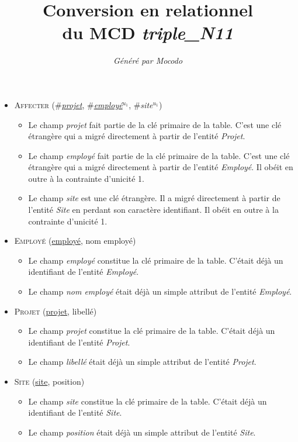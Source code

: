 \documentclass[a4paper]{article}
\title{Conversion en relationnel\\du MCD \emph{triple_N11}}
\author{\emph{Généré par Mocodo}}
\newcommand{\relat}[1]{\textsc{#1}}
\newcommand{\attr}[1]{#1}
\newcommand{\prim}[1]{\uline{#1}}
\newcommand{\foreign}[1]{\#\textsl{#1}}
\begin{document}
\maketitle

\begin{itemize}
  \item \relat{Affecter} (\foreign{\prim{projet}}, \foreign{\prim{employé}}$^{u_1}$, \foreign{site}$^{u_1}$)
  \begin{itemize}
    \item Le champ \emph{projet} fait partie de la clé primaire de la table. C'est une clé étrangère qui a migré directement à partir de l'entité \emph{Projet}.
    \item Le champ \emph{employé} fait partie de la clé primaire de la table. C'est une clé étrangère qui a migré directement à partir de l'entité \emph{Employé}. Il obéit en outre à la contrainte d'unicité 1.
    \item Le champ \emph{site} est une clé étrangère. Il a migré directement à partir de l'entité \emph{Site} en perdant son caractère identifiant. Il obéit en outre à la contrainte d'unicité 1.
  \end{itemize}

  \item \relat{Employé} (\prim{employé}, \attr{nom employé})
  \begin{itemize}
    \item Le champ \emph{employé} constitue la clé primaire de la table. C'était déjà un identifiant de l'entité \emph{Employé}.
    \item Le champ \emph{nom employé} était déjà un simple attribut de l'entité \emph{Employé}.
  \end{itemize}

  \item \relat{Projet} (\prim{projet}, \attr{libellé})
  \begin{itemize}
    \item Le champ \emph{projet} constitue la clé primaire de la table. C'était déjà un identifiant de l'entité \emph{Projet}.
    \item Le champ \emph{libellé} était déjà un simple attribut de l'entité \emph{Projet}.
  \end{itemize}

  \item \relat{Site} (\prim{site}, \attr{position})
  \begin{itemize}
    \item Le champ \emph{site} constitue la clé primaire de la table. C'était déjà un identifiant de l'entité \emph{Site}.
    \item Le champ \emph{position} était déjà un simple attribut de l'entité \emph{Site}.
  \end{itemize}

\end{itemize}
\end{document}
